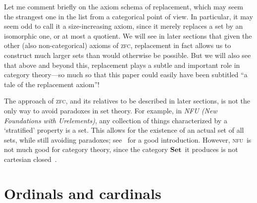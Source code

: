 \documentclass{amsart}
\newcommand{\Set}{\ensuremath{\mathbf{Set}}}
\def\zfc{\textsc{zfc}}
\def\nfu{\textsc{nfu}}
\begin{document}
Let me comment briefly on the axiom schema of replacement, which may
seem the strangest one in the list from a categorical point of view.
In particular, it may seem odd to call it a size-increasing axiom,
since it merely replaces a set by an isomorphic one, or at most a
quotient.  We will see in later sections that given the other (also
non-categorical) axioms of \zfc, replacement in fact allows us to
construct much larger sets than would otherwise be possible.  But we
will also see that above and beyond this, replacement plays a subtle
and important role in category theory---so much so that this paper
could easily have been subtitled ``a tale of the replacement axiom''!

\begin{rmk}
  The approach of \zfc, and its relatives to be described in later
  sections, is not the only way to avoid paradoxes in set theory.  For
  example, in \emph{NFU (New Foundations with Urelements)}, any
  collection of things characterized by a `stratified' property is a
  set.  This allows for the existence of an actual set of all sets,
  while still avoiding paradoxes; see~\cite{holmes:nfu} for a good
  introduction.  However, \nfu\ is not much good for category theory,
  since the category \Set\ it produces is not cartesian
  closed~\cite{mclarty:nf-not-cc}.
\end{rmk}


\section{Ordinals and cardinals}
\label{sec:ordinals}
\end{document}

